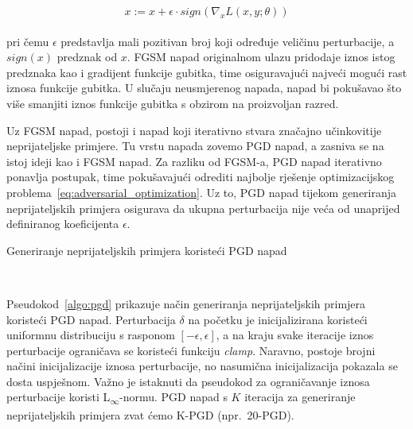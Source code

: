 \documentclass[times, utf8, zavrsni, numeric]{fer}
\begin{document}
\begin{equation}
    x := x + \epsilon \cdot sign(\nabla_{x}L(x,y;\theta))
    \label{eq:fgsm}
\end{equation}
\\
pri čemu $\epsilon$ predstavlja mali pozitivan broj koji određuje veličinu perturbacije, a $sign(x)$ predznak od $x$. 
FGSM napad originalnom ulazu pridodaje iznos istog predznaka kao i gradijent funkcije gubitka, time osiguravajući najveći mogući rast iznosa funkcije gubitka. 
U slučaju neusmjerenog napada, napad bi pokušavao što više smanjiti iznos funkcije gubitka s obzirom na proizvoljan razred.

Uz FGSM napad, postoji i napad koji iterativno stvara značajno učinkovitije neprijateljske primjere. 
Tu vrstu napada zovemo PGD napad, a zasniva se na istoj ideji kao i FGSM napad. 
Za razliku od FGSM-a, PGD napad iterativno ponavlja postupak, time pokušavajući odrediti najbolje rješenje optimizacijskog problema~\ref{eq:adversarial_optimization}.
Uz to, PGD napad tijekom generiranja neprijateljskih primjera osigurava da ukupna perturbacija nije veća od unaprijed definiranog koeficijenta $\epsilon$.

\begin{algorithm}
    \caption{Generiranje neprijateljskih primjera koristeći PGD napad}
    \label{algo:pgd}
    \begin{algorithmic}
        \\\hrulefill
        \ENDFOR
    \end{algorithmic}
\end{algorithm}

\pagebreak

Pseudokod~\ref{algo:pgd} prikazuje način generiranja neprijateljskih primjera koristeći PGD napad. 
Perturbacija $\delta$ na početku je inicijalizirana koristeći uniformnu distribuciju s rasponom $[-\epsilon, \epsilon]$, 
a na kraju svake iteracije iznos perturbacije ograničava se koristeći funkciju \textit{clamp}. 
Naravno, postoje brojni načini inicijalizacije iznosa perturbacije, no nasumična inicijalizacija pokazala se dosta uspješnom.
Važno je istaknuti da pseudokod za ograničavanje iznosa perturbacije koristi L\textsubscript{$\infty$}-normu. 
PGD napad s $K$ iteracija za generiranje neprijateljskih primjera zvat ćemo K-PGD (npr.\ 20-PGD).
\end{document}
